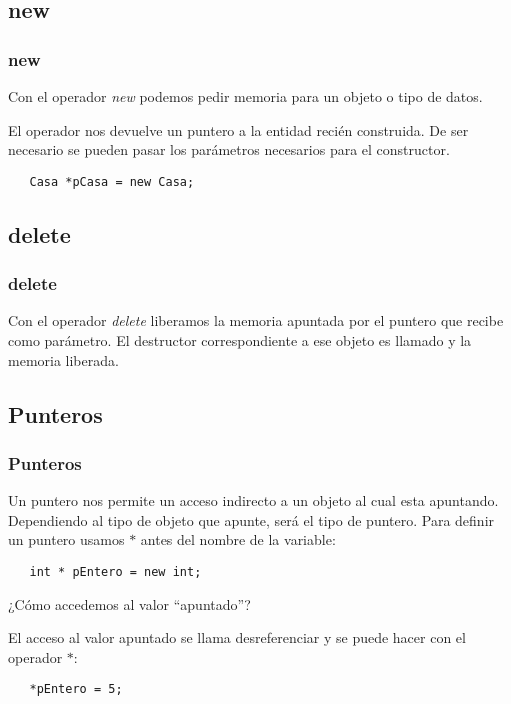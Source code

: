 \documentclass{beamer}
\begin{document}
\subsection{new}
\begin{frame}[fragile]
\frametitle{new}
Con el operador \emph{new} podemos pedir memoria para un objeto o tipo de datos.

El operador nos devuelve un puntero a la entidad recién construida. De ser necesario se pueden pasar los parámetros necesarios para el constructor.

\begin{verbatim}
   Casa *pCasa = new Casa;
\end{verbatim}

\end{frame}

\subsection{delete}
\begin{frame}
\frametitle{delete}

Con el operador \emph{delete} liberamos la memoria apuntada por el puntero que recibe como parámetro.
El destructor correspondiente a ese objeto es llamado y la memoria liberada.

\end{frame}

\subsection{Punteros}
\begin{frame}[fragile]
\frametitle{Punteros}

Un puntero nos permite un acceso indirecto a un objeto al cual esta apuntando.
Dependiendo al tipo de objeto que apunte, será el tipo de puntero.
Para definir un puntero usamos $*$ antes del nombre de la variable:

\begin{verbatim}
   int * pEntero = new int;
\end{verbatim}

¿Cómo accedemos al valor ``apuntado''?

El acceso al valor apuntado se llama desreferenciar y se puede hacer con el operador $*$:

\begin{verbatim}
   *pEntero = 5;
\end{verbatim}

\end{frame}
\end{document}

